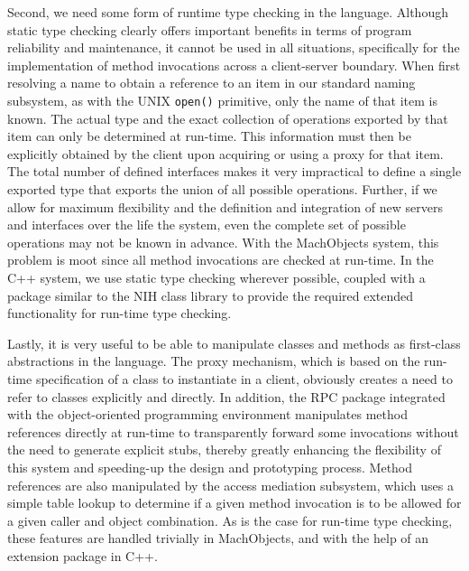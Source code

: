 Second, we need some form of runtime type checking in the language.
Although static type checking clearly offers important benefits in
terms of program reliability and maintenance, it cannot be used in all
situations, specifically for the implementation of method invocations
across a client-server boundary. When first resolving a name to obtain
a reference to an item in our standard naming subsystem, as with the
UNIX {\tt open()} primitive, only the name of that item is known. The
actual type and the exact collection of operations exported by that
item can only be determined at run-time. This information must then be
explicitly obtained by the client upon acquiring or using a proxy for
that item.  The total number of defined interfaces makes it very
impractical to define a single exported type that exports the union of
all possible operations.  Further, if we allow for maximum flexibility
and the definition and integration of new servers and interfaces over
the life the system, even the complete set of possible operations may
not be known in advance.  With the MachObjects system, this problem is
moot since all method invocations are checked at run-time. In the C++
system, we use static type checking wherever possible, coupled with a
package similar to the NIH class library\cite{GORLEN90} to provide the
required extended functionality for run-time type checking.

Lastly, it is very useful to be able to manipulate classes and methods
as first-class abstractions in the language. The proxy mechanism,
which is based on the run-time specification of a class to instantiate
in a client, obviously creates a need to refer to classes explicitly
and directly. In addition, the RPC package integrated with the
object-oriented programming environment manipulates method references
directly at run-time to transparently forward some invocations without
the need to generate explicit stubs, thereby greatly enhancing the
flexibility of this system and speeding-up the design and prototyping
process. Method references are also manipulated by the access
mediation subsystem, which uses a simple table lookup to determine if
a given method invocation is to be allowed for a given caller and
object combination.  As is the case for run-time type checking, these
features are handled trivially in MachObjects, and with the help of an
extension package in C++.



